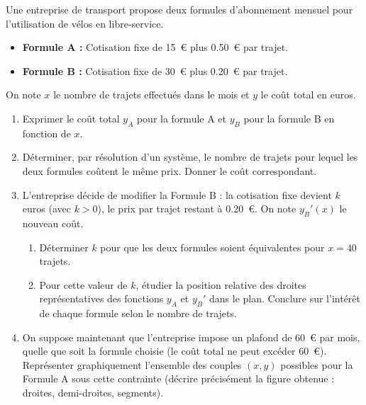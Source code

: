 \documentclass[11pt]{article}
\begin{document}
\begin{exercice}
Une entreprise de transport propose deux formules d'abonnement mensuel pour l'utilisation de vélos en libre-service.
\begin{itemize}
    \item \textbf{Formule A :} Cotisation fixe de \SI{15}{\euro} plus \SI{0,50}{\euro} par trajet.
    \item \textbf{Formule B :} Cotisation fixe de \SI{30}{\euro} plus \SI{0,20}{\euro} par trajet.
\end{itemize}
On note $x$ le nombre de trajets effectués dans le mois et $y$ le coût total en euros.
\begin{enumerate}
    \item Exprimer le coût total $y_A$ pour la formule A et $y_B$ pour la formule B en fonction de $x$.
    \item Déterminer, par résolution d'un système, le nombre de trajets pour lequel les deux formules coûtent le même prix. Donner le coût correspondant.
    \item L'entreprise décide de modifier la Formule B : la cotisation fixe devient $k$ euros (avec $k > 0$), le prix par trajet restant à \SI{0,20}{\euro}. On note $y_B'(x)$ le nouveau coût.
    \begin{enumerate}
        \item Déterminer $k$ pour que les deux formules soient équivalentes pour $x = 40$ trajets.
        \item Pour cette valeur de $k$, étudier la position relative des droites représentatives des fonctions $y_A$ et $y_B'$ dans le plan. Conclure sur l'intérêt de chaque formule selon le nombre de trajets.
    \end{enumerate}
    \item On suppose maintenant que l'entreprise impose un plafond de \SI{60}{\euro} par mois, quelle que soit la formule choisie (le coût total ne peut excéder \SI{60}{\euro}). Représenter graphiquement l'ensemble des couples $(x, y)$ possibles pour la Formule A sous cette contrainte (décrire précisément la figure obtenue : droites, demi-droites, segments).
\end{enumerate}
\end{exercice}
\end{document}
